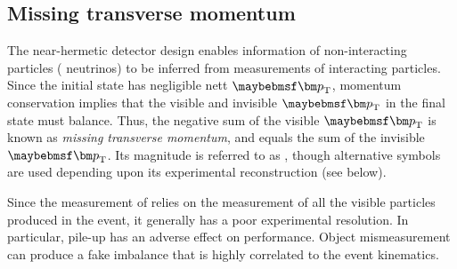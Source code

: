\subsection{Missing transverse momentum}
\label{sec:objects:met}

The near-hermetic detector design enables information of non-interacting particles (\eg 
neutrinos) to be inferred from measurements of interacting particles. Since the initial 
state has negligible nett $\bvec{p}_{\text{T}}$, momentum conservation implies that the 
visible and invisible $\bvec{p}_{\text{T}}$ in the final state must balance. Thus, 
the negative sum of the visible $\bvec{p}_{\text{T}}$ is known as \textit{missing 
transverse momentum}, and equals the sum of the invisible $\bvec{p}_{\text{T}}$. Its 
magnitude is referred to as \met, though alternative symbols are used depending upon its 
experimental reconstruction (see below).

Since the measurement of \met relies on the measurement of all the visible particles 
produced in the event, it generally has a poor experimental resolution.
In particular, pile-up has an adverse effect on performance. 
Object mismeasurement can produce a fake imbalance that is highly correlated to the event 
kinematics.

